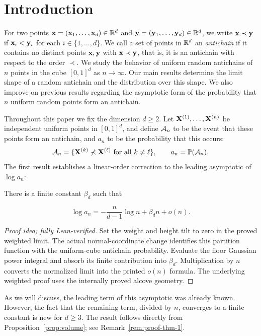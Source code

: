 \documentclass[11pt,letterpaper]{article}
\begin{document}
\newpage

\tableofcontents

\section{Introduction}

For two points $\mathbf x=(\mathbf x_{1},\ldots,\mathbf x_{d})\in\mathbb R^d$ and $\mathbf y=(\mathbf y_{1},\ldots,\mathbf y_{d})\in\mathbb R^d$, we write $\mathbf x\prec\mathbf y$ if $\mathbf x_{i}<\mathbf y_{i}$ for each $i\in\{1,\ldots,d\}$. We call a set of points in $\mathbb R^d$ an \emph{antichain} if it contains no distinct points $\mathbf x,\mathbf y$ with $\mathbf x\prec\mathbf y$, that is, it is an antichain with respect to the order $\prec$. We study the behavior of uniform random antichains of $n$ points in the cube $[0,1]^d$ as $n\to\infty$. Our main results determine the limit shape of a random antichain and the distribution over this shape. We also improve on previous results regarding the asymptotic form of the probability that $n$ uniform random points form an antichain.

Throughout this paper we fix the dimension $d\ge2$. Let $\mathbf X^{(1)},\ldots,\mathbf X^{(n)}$ be independent uniform points in $[0,1]^d$, and define $\mathcal A_n$ to be the event that these points form an antichain, and $a_{n}$ to be the probability that this occurs:
\[
      \mathcal A_n=\{\mathbf X^{(k)}\not\prec\mathbf X^{(\ell)}\text{ for all }k\ne\ell\}, \qquad a_n=\mathbb P(\mathcal A_n).
\]
The first result establishes a linear-order correction to the leading asymptotic of $\log a_n$:

\begin{theorem}\label{thm:counting}
      There is a finite constant $\beta_d$ such that

      \begin{equation}\label{eq:counting}
            \log a_n=-\frac n{d-1}\log n+\beta_d n+o(n).
      \end{equation}
\end{theorem}

\begin{proof}[Proof idea; fully Lean-verified]
Set the weight and height tilt to zero in the proved weighted limit. The actual normal-coordinate change identifies this partition function with the uniform-cube antichain probability. Evaluate the floor Gaussian power integral and absorb its finite contribution into $\beta_d$. Multiplication by $n$ converts the normalized limit into the printed $o(n)$ formula. The underlying weighted proof uses the internally proved alcove geometry.
\end{proof}
As we will discuss, the leading term of this asymptotic was already known. However, the fact that the remaining term, divided by $n$, converges to a finite constant is new for $d\ge3$. The result follows directly from Proposition~\ref{prop:volume}; see Remark~\ref{rem:proof-thm-1}.
\end{document}
